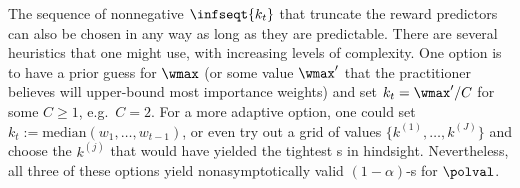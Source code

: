 \begin{remark}
  The sequence of nonnegative $\infseqt{k_t}$ that truncate the reward predictors can also be chosen in any way as long as they are predictable. There are several heuristics that one might use, with increasing levels of complexity. One option is to have a prior guess for $\wmax$ (or some value $\wmax'$ that the practitioner believes will upper-bound most importance weights) and set $k_t = \wmax' / C$ for some $C \geq 1$, e.g.~$C = 2$. For a more adaptive option, one could set $k_t := \mathrm{median}(w_1, \dots, w_{t-1})$, or even try out a grid of values $\{k^{(1)}, \dots, k^{(J)}\}$ and choose the $k^{(j)}$ that would have yielded the tightest \cs{}s in hindsight. Nevertheless, all three of these options yield nonasymptotically valid $(1-\alpha)$-\cs{}s for $\polval$.
\end{remark}

